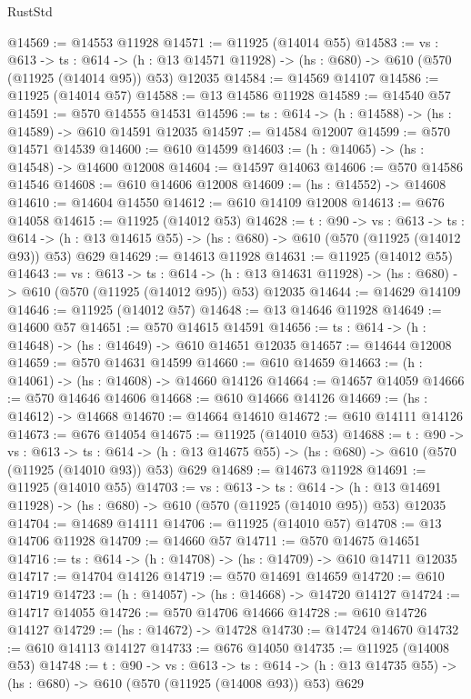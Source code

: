 \begin{lexlean}{RustStd}
\begin{coremodule}
@14569 := @14553 @11928
@14571 := @11925 (@14014 @55)
@14583 := {vs : @613} ->
  {ts : @614} ->
  (h : @13 @14571 @11928) -> (hs : @680) -> @610 (@570 (@11925 (@14014 @95)) @53) @12035
@14584 := @14569 @14107
@14586 := @11925 (@14014 @57)
@14588 := @13 @14586 @11928
@14589 := @14540 @57
@14591 := @570 @14555 @14531
@14596 := {ts : @614} -> (h : @14588) -> (hs : @14589) -> @610 @14591 @12035
@14597 := @14584 @12007
@14599 := @570 @14571 @14539
@14600 := @610 @14599
@14603 := (h : @14065) -> (hs : @14548) -> @14600 @12008
@14604 := @14597 @14063
@14606 := @570 @14586 @14546
@14608 := @610 @14606 @12008
@14609 := (hs : @14552) -> @14608
@14610 := @14604 @14550
@14612 := @610 @14109 @12008
@14613 := @676 @14058
@14615 := @11925 (@14012 @53)
@14628 := {t : @90} ->
  {vs : @613} ->
  {ts : @614} -> (h : @13 @14615 @55) -> (hs : @680) -> @610 (@570 (@11925 (@14012 @93)) @53) @629
@14629 := @14613 @11928
@14631 := @11925 (@14012 @55)
@14643 := {vs : @613} ->
  {ts : @614} ->
  (h : @13 @14631 @11928) -> (hs : @680) -> @610 (@570 (@11925 (@14012 @95)) @53) @12035
@14644 := @14629 @14109
@14646 := @11925 (@14012 @57)
@14648 := @13 @14646 @11928
@14649 := @14600 @57
@14651 := @570 @14615 @14591
@14656 := {ts : @614} -> (h : @14648) -> (hs : @14649) -> @610 @14651 @12035
@14657 := @14644 @12008
@14659 := @570 @14631 @14599
@14660 := @610 @14659
@14663 := (h : @14061) -> (hs : @14608) -> @14660 @14126
@14664 := @14657 @14059
@14666 := @570 @14646 @14606
@14668 := @610 @14666 @14126
@14669 := (hs : @14612) -> @14668
@14670 := @14664 @14610
@14672 := @610 @14111 @14126
@14673 := @676 @14054
@14675 := @11925 (@14010 @53)
@14688 := {t : @90} ->
  {vs : @613} ->
  {ts : @614} -> (h : @13 @14675 @55) -> (hs : @680) -> @610 (@570 (@11925 (@14010 @93)) @53) @629
@14689 := @14673 @11928
@14691 := @11925 (@14010 @55)
@14703 := {vs : @613} ->
  {ts : @614} ->
  (h : @13 @14691 @11928) -> (hs : @680) -> @610 (@570 (@11925 (@14010 @95)) @53) @12035
@14704 := @14689 @14111
@14706 := @11925 (@14010 @57)
@14708 := @13 @14706 @11928
@14709 := @14660 @57
@14711 := @570 @14675 @14651
@14716 := {ts : @614} -> (h : @14708) -> (hs : @14709) -> @610 @14711 @12035
@14717 := @14704 @14126
@14719 := @570 @14691 @14659
@14720 := @610 @14719
@14723 := (h : @14057) -> (hs : @14668) -> @14720 @14127
@14724 := @14717 @14055
@14726 := @570 @14706 @14666
@14728 := @610 @14726 @14127
@14729 := (hs : @14672) -> @14728
@14730 := @14724 @14670
@14732 := @610 @14113 @14127
@14733 := @676 @14050
@14735 := @11925 (@14008 @53)
@14748 := {t : @90} ->
  {vs : @613} ->
  {ts : @614} -> (h : @13 @14735 @55) -> (hs : @680) -> @610 (@570 (@11925 (@14008 @93)) @53) @629

\end{coremodule}
\end{lexlean}
